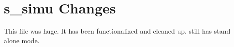 \section{s\_simu Changes}
This file was huge.
It has been functionalized and cleaned up.
still has stand alone mode.